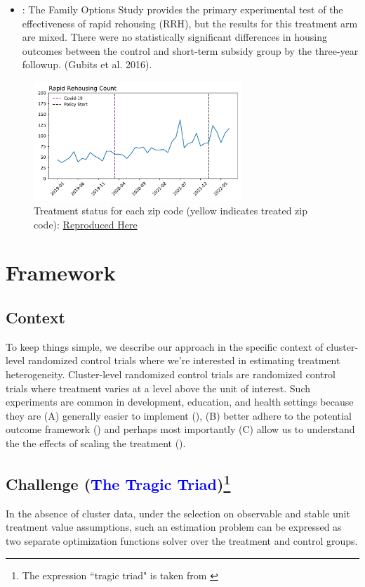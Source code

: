 \documentclass[a4paper,12pt]{article}
\begin{document}
\begin{itemize}
    \item \cite{evans2019reducing}: The Family Options Study provides the primary experimental test of the effectiveness of rapid rehousing (RRH), but the results for this treatment arm are mixed. There were no statistically significant
differences in housing outcomes between the control and short-term subsidy group by the three-year followup. (Gubits et al. 2016).
\end{itemize}
\begin{figure}[htbp]
\centering
\includegraphics[width=0.7\textwidth]{figures/rtc/context/rrh_counts.pdf}
        \caption{Treatment status for each zip code (yellow indicates treated zip code): \href{https://github.com/pharringtonp19/evictions/blob/main/scripts/cceh/plot/summary_rrh.py}{Reproduced Here}}
\end{figure}
\section{Framework}
\label{sec:framework}
\subsection{Context}
To keep things simple, we describe our approach in the specific context of cluster-level randomized control trials where we're interested in estimating treatment heterogeneity. Cluster-level randomized control trials are randomized control trials where treatment varies at a level above the unit of interest. Such experiments are common in development, education, and health settings because they are (A) generally easier to implement (\cite{gerber2012field}), (B) better adhere to the potential outcome framework (\cite{imbens2015causal}) and perhaps most importantly (C) allow us to understand the the effects of scaling the treatment (\cite{list2021voltage}). 


\subsection{Challenge (\textcolor{blue}{The Tragic Triad})\footnote{The expression ``tragic triad" is taken from \cite{yu2020gradient}}}
In the absence of cluster data, under the selection on observable and stable unit treatment value assumptions, such an estimation problem can be expressed as two separate optimization functions solver over the treatment and control groups. 
\end{document}
